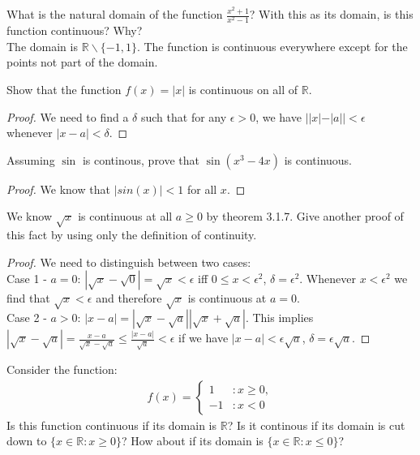 \documentclass[12pt]{article}
\newcommand{\R}{\mathbb{R}}
\newenvironment{exercise}[2][Exercise]{\begin{trivlist}
\item[\hskip \labelsep {\bfseries #1}\hskip \labelsep {\bfseries #2.}]}{\end{trivlist}}
\begin{document}
\begin{exercise}{3.1.2}
What is the natural domain of the function $\frac{x^2 +1}{x^2-1}$? With this as its domain, is this function continuous? Why? \\

The domain is $\R \backslash \{-1,1\}$. The function is continuous everywhere except for the points not part of the domain.
\end{exercise}

\begin{exercise}{3.1.4}
Show that the function $f(x) = |x|$ is continuous on all of $\R$.

	\begin{proof}
	We need to find a $\delta$ such that for any $\epsilon > 0$, we have $||x| - |a|| < \epsilon$ whenever $|x-a|< \delta$.
	\end{proof}
\end{exercise}

\begin{exercise}{3.1.5}
Assuming $\sin$ is continous, prove that $\sin(x^3-4x)$ is continuous.

	\begin{proof}
	We know that $|sin(x)| < 1$ for all $x$.  
	\end{proof}
\end{exercise}

\begin{exercise}{3.1.8}
    We know $\sqrt{x}$ is continuous at all $a \geq 0$ by theorem 3.1.7. Give another proof of this fact by using only the definition of continuity. 
    
    \begin{proof}
    We need to distinguish between two cases: \\
    Case 1 - $a= 0$: $|\sqrt{x} - \sqrt{0}| = \sqrt{x} < \epsilon$ iff $0 \leq x < \epsilon^2$, $\delta=\epsilon^2$. Whenever $x<\epsilon^2$ we find that $\sqrt{x}< \epsilon$ and therefore $\sqrt{x}$ is continuous at $a=0$. \\
    Case 2 - $a>0$: $|x-a|=|\sqrt{x}-\sqrt{a}| |\sqrt{x}+\sqrt{a}|$. This implies $|\sqrt{x}-\sqrt{a}| = \frac{x-a}{\sqrt{x}-\sqrt{a}} \leq \frac{|x-a|}{\sqrt{a}} < \epsilon$ if we have $|x-a| < \epsilon \sqrt{a}$, $\delta=\epsilon \sqrt{a}$.
    \end{proof}
\end{exercise}

\begin{exercise}{3.1.9}
Consider the function:
	\begin{align*}
	f(x) = \left\{
     \begin{array}{lr}
       1 & : x \geq 0,\\
       -1 & : x < 0
     \end{array}
   \right.
	\end{align*}
Is this function continuous if its domain is $\R$? Is it continous if its domain is cut down to $\{ x\in \R: x \geq 0 \}$? How about if its domain is $\{x \in \R : x \leq 0 \}$?
\end{exercise}
\end{document}
